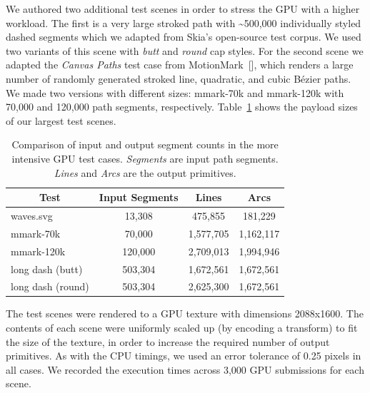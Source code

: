\documentclass[sigconf, nonacm]{acmart}
\begin{document}
We authored two additional test scenes in order to stress the GPU with a higher workload. The first is a very large stroked path with \textasciitilde500,000 individually styled dashed segments which we adapted from Skia's open-source test corpus. We used two variants of this scene with \emph{butt} and \emph{round} cap styles. For the second scene we adapted the \emph{Canvas Paths} test case from MotionMark~[], which renders a large number of randomly generated stroked line, quadratic, and cubic Bézier paths. We made two versions with different sizes: mmark-70k and mmark-120k with 70,000 and 120,000 path segments, respectively. Table~\ref{table:bump-counts} shows the payload sizes of our largest test scenes.

\begin{table}
    \caption{Comparison of input and output segment counts in the more intensive GPU test cases. \emph{Segments} are input path segments. \emph{Lines} and \emph{Arcs} are the output primitives.}
    \begin{tabular}{|l|c|c|c|}
    \hline
        \multicolumn{1}{|c|}{\textbf{Test}} & \textbf{Input Segments} & \textbf{Lines} & \textbf{Arcs} \\
    \hline
        waves.svg & 13,308 & 475,855 & 181,229 \\
        mmark-70k & 70,000 & 1,577,705 & 1,162,117 \\
        mmark-120k & 120,000 & 2,709,013 & 1,994,946 \\
        long dash (butt) & 503,304 & 1,672,561 & 1,672,561 \\
        long dash (round) & 503,304 & 2,625,300 & 1,672,561 \\
    \hline
    \end{tabular}
    \label{table:bump-counts}
\end{table}

The test scenes were rendered to a GPU texture with dimensions 2088x1600. The contents of each scene were uniformly scaled up (by encoding a transform) to fit the size of the texture, in order to increase the required number of output primitives. As with the CPU timings, we used an error tolerance of 0.25 pixels in all cases. We recorded the execution times across 3,000 GPU submissions for each scene.
\end{document}
